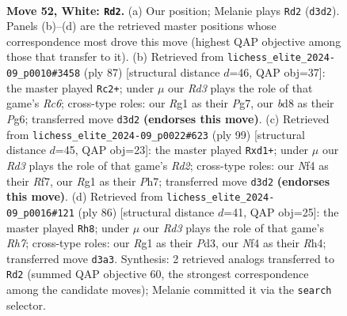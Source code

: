\documentclass[11pt]{article}
\begin{document}
\clearpage

\begin{figure}[p]\centering
\begin{subfigure}{0.46\textwidth}\centering
\resizebox{\linewidth}{!}{%
\newchessgame
\chessboard[
  setfen={1nkb4/1p5p/6pP/p4p2/r4N2/3R2P1/7K/6R1 w - - 0 52},
  showmover=false,
  pgfstyle=straightmove, color=movearrow, markmove={d3-d2}
]}
\caption{}
\end{subfigure}\hfill
\begin{subfigure}{0.46\textwidth}\centering
\resizebox{\linewidth}{!}{%
\newchessgame
\chessboard[
  setfen={6k1/6p1/6p1/5p2/4nP2/2r3P1/6KP/4R1B1 b - - 1 44},
  showmover=false,
  pgfstyle=straightmove, color=movearrow, markmove={c3-c2}
]}
\caption{}
\end{subfigure}
\\[4pt]
\begin{subfigure}{0.46\textwidth}\centering
\resizebox{\linewidth}{!}{%
\newchessgame
\chessboard[
  setfen={8/3r1rkp/6p1/2R5/5P2/1P4BP/P5P1/3R2K1 b - - 0 50},
  showmover=false,
  pgfstyle=straightmove, color=movearrow, markmove={d7-d1}
]}
\caption{}
\end{subfigure}\hfill
\begin{subfigure}{0.46\textwidth}\centering
\resizebox{\linewidth}{!}{%
\newchessgame
\chessboard[
  setfen={1k1r4/pp1b3R/2p5/P7/1P5R/2KP3p/8/8 w - - 3 44},
  showmover=false,
  pgfstyle=straightmove, color=movearrow, markmove={h7-h8}
]}
\caption{}
\end{subfigure}
\caption{\textbf{Move 52, White: \texttt{Rd2}.} (a) Our position; Melanie plays \texttt{Rd2} (\texttt{d3d2}). Panels (b)--(d) are the retrieved master positions whose correspondence most drove this move (highest QAP objective among those that transfer to it). (b) Retrieved from \texttt{lichess\_elite\_2024-09\_p0010\#3458} (ply 87) [structural distance $d$=46, QAP obj=37]: the master played \texttt{Rc2+}; under $\mu$ our \emph{Rd3} plays the role of that game's \emph{Rc6}; cross-type roles: our \emph{R}g1 as their \emph{P}g7, our \emph{b}d8 as their \emph{P}g6; transferred move \texttt{d3d2} \textbf{(endorses this move)}. (c) Retrieved from \texttt{lichess\_elite\_2024-09\_p0022\#623} (ply 99) [structural distance $d$=45, QAP obj=23]: the master played \texttt{Rxd1+}; under $\mu$ our \emph{Rd3} plays the role of that game's \emph{Rd2}; cross-type roles: our \emph{N}f4 as their \emph{R}f7, our \emph{R}g1 as their \emph{P}h7; transferred move \texttt{d3d2} \textbf{(endorses this move)}. (d) Retrieved from \texttt{lichess\_elite\_2024-09\_p0016\#121} (ply 86) [structural distance $d$=41, QAP obj=25]: the master played \texttt{Rh8}; under $\mu$ our \emph{Rd3} plays the role of that game's \emph{Rh7}; cross-type roles: our \emph{R}g1 as their \emph{P}d3, our \emph{N}f4 as their \emph{R}h4; transferred move \texttt{d3a3}. Synthesis: 2 retrieved analogs transferred to \texttt{Rd2} (summed QAP objective 60, the strongest correspondence among the candidate moves); Melanie committed it via the \texttt{search} selector.}
\label{fig:thought-m102}
\end{figure}
\end{document}
